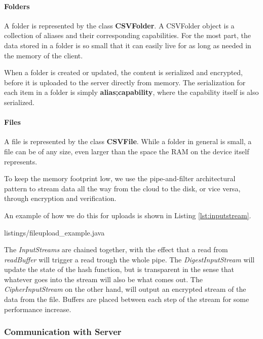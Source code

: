 \documentclass[pdftex,english,10pt,b5paper,twoside]{book}
\begin{document}
\paragraph{Folders}

A folder is represented by the class \textbf{CSVFolder}. A CSVFolder object is
a collection of aliases and their corresponding capabilities. For
the most part, the data stored in a folder is so small that it can easily live for
as long as needed in the memory of the client.

When a folder is created or updated, the content is serialized and encrypted,
before it is uploaded to the server directly from memory. The serialization for
each item in a folder is simply \textbf{alias;capability}, where the capability
itself is also serialized.

\paragraph{Files}

A file is represented by the class \textbf{CSVFile}. While a folder in general is small,
a file can be of any size, even larger than the space the \ac{RAM} on the
device itself represents.

To keep the memory footprint low, we use the pipe-and-filter architectural
pattern to stream data all the way from the cloud to the disk, or vice versa,
through encryption and verification.

An example of how we do this for uploads is shown in Listing
\ref{lst:inputstream}.


{listings/fileupload_example.java}

The \emph{InputStreams} are chained together, with the effect that a read from
\emph{readBuffer} will trigger a read trough the whole pipe. The
\emph{DigestInputStream} will update the state of the hash function, but is
transparent in the sense that whatever goes into the stream will also be what
comes out. The \emph{CipherInputStream} on the other hand, will output an encrypted
stream of the data from the file. Buffers are placed between each step of the
stream for some performance increase.

\subsubsection{Communication with Server}
\end{document}
